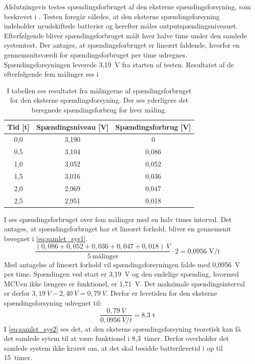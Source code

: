Afslutningsvis testes spændingsforbruget af den eksterne spændingsforsyning, som beskrevet i . Testen foregår således, at den eksterne spændingsforsyning indeholder nyudskiftede batterier og herefter måles outputspændingsniveauet. Efterfølgende bliver spændingsforbruget målt hver halve time under den samlede systemtest. Der antages, at spændingsforbruget er lineært faldende, hvorfor en gennemsnitsværdi for spændingsforbruget per time udregnes. \\
Spændingsforsyningen leverede 3,19~V fra starten af testen. Resultatet af de efterfølgende fem målinger ses i 
\begin{table}[H]
	\centering
	\begin{tabular}{ccc}
		\hline
		\cellcolor[HTML]{C0C0C0}Tid {[}t{]} & \cellcolor[HTML]{C0C0C0} Spændingsniveau {[}V{]} & \cellcolor[HTML]{C0C0C0}Spændingsforbrug {[}V{]} \\ \hline
		0,0 & 3,190 & 0 \\ \hline	
		0,5 & 3,104 & 0,086 \\ \hline	
		1,0 & 3,052 & 0,052 \\ \hline
		1,5 & 3,016 & 0,036 \\ \hline
		2,0 & 2,969 & 0,047 \\ \hline
		2,5 & 2,951 & 0,018 \\ \hline
	\end{tabular}
	\caption{I tabellen ses resultatet fra målingerne af spændingsforbruget for den eksterne spændingsforsyning. Der ses yderligere det beregnede spændingsforbrug for hver måling.}
	\label{tab:samlet_sys_batteri}
\end{table}\vspace{-.25cm}
I  ses spændingsforbruget over fem målinger med en halv times interval. Det antages, at spændingsforbruget har et lineært forhold, bliver en gennemsnit beregnet i \eqref{eq:samlet_sys1}.
\begin{equation}
\frac{(0,086 + 0,052 + 0,036 + 0,047 + 0,018)~V}{5~\text{målinger}} \cdot 2 = \text{0,0956~V/t}
\label{eq:samlet_sys1}
\end{equation}
Med antagelse af lineært forhold vil spændingsforsyningen falde med 0,0956~V per time. Spændingen ved start er 3,19~V og den endelige spænding, hvormed MCUen ikke længere er funktionel, er 1,71~V. Det maksimale spændingsinterval er derfor $3,19~V - 2,40~V = 0,79~V$. Derfor er levetiden for den eksterne spændingsforsyning udregnet til:
\begin{equation}
\frac{0,79~V}{0,0956~V/t} = \text{8,3~t}
\label{eq:samlet_sys2}
\end{equation}
I \eqref{eq:samlet_sys2} ses det, at den eksterne spændingsforsyning teoretisk kan få det samlede sytem til at være funktionel i 8,3~timer. Derfor overholder det samlede system ikke kravet om, at det skal besidde batterilevetid i op til 15~timer. 
